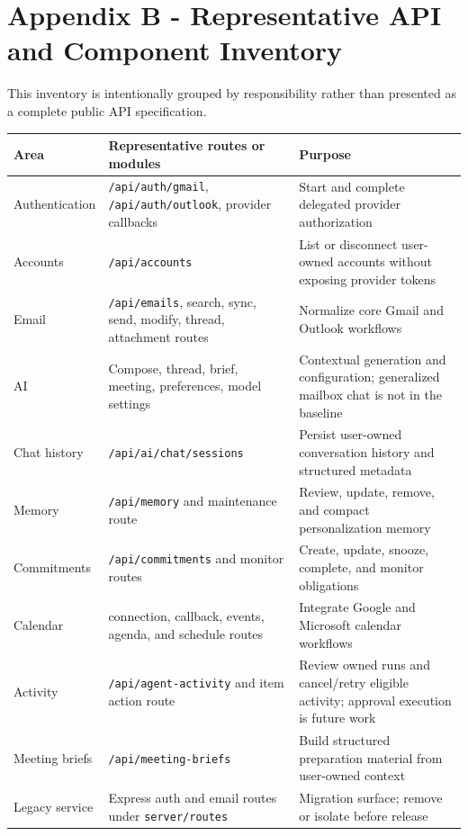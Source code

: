 \documentclass[
]{report}
\begin{document}
\section{Appendix B - Representative API and Component
Inventory}\label{appendix-b---representative-api-and-component-inventory}

This inventory is intentionally grouped by responsibility rather than
presented as a complete public API specification.

\begin{longtable}[]{@{}p{}p{}p{}@{}}
\toprule\noalign{}
Area & Representative routes or modules & Purpose \\
\midrule\noalign{}
\endhead
\bottomrule\noalign{}
\endlastfoot
Authentication & \texttt{/api/auth/gmail}, \texttt{/api/auth/outlook},
provider callbacks & Start and complete delegated provider
authorization \\
Accounts & \texttt{/api/accounts} & List or disconnect user-owned
accounts without exposing provider tokens \\
Email & \texttt{/api/emails}, search, sync, send, modify, thread,
attachment routes & Normalize core Gmail and Outlook workflows \\
AI & Compose, thread, brief, meeting, preferences, model settings &
Contextual generation and configuration; generalized mailbox chat is
not in the baseline \\
Chat history & \texttt{/api/ai/chat/sessions} & Persist user-owned
conversation history and structured metadata \\
Memory & \texttt{/api/memory} and maintenance route & Review, update,
remove, and compact personalization memory \\
Commitments & \texttt{/api/commitments} and monitor routes & Create,
update, snooze, complete, and monitor obligations \\
Calendar & connection, callback, events, agenda, and schedule routes &
Integrate Google and Microsoft calendar workflows \\
Activity & \texttt{/api/agent-activity} and item action route & Review
owned runs and cancel/retry eligible activity; approval execution is
future work \\
Meeting briefs & \texttt{/api/meeting-briefs} & Build structured
preparation material from user-owned context \\
Legacy service & Express auth and email routes under
\texttt{server/routes} & Migration surface; remove or isolate before
release \\
\end{longtable}
\end{document}
